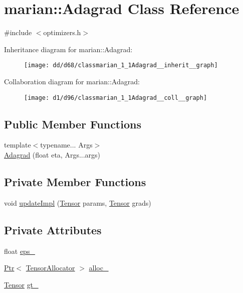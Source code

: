\hypertarget{classmarian_1_1Adagrad}{}\section{marian\+:\+:Adagrad Class Reference}
\label{classmarian_1_1Adagrad}


{\ttfamily \#include $<$optimizers.\+h$>$}



Inheritance diagram for marian\+:\+:Adagrad\+:
\nopagebreak
\begin{figure}[H]
\begin{center}
\leavevmode
\texttt{[image: dd/d68/classmarian\_1\_1Adagrad\_\_inherit\_\_graph]}
\end{center}
\end{figure}


Collaboration diagram for marian\+:\+:Adagrad\+:
\nopagebreak
\begin{figure}[H]
\begin{center}
\leavevmode
\texttt{[image: d1/d96/classmarian\_1\_1Adagrad\_\_coll\_\_graph]}
\end{center}
\end{figure}
\subsection*{Public Member Functions}
\begin{DoxyCompactItemize}
\item 
{\footnotesize template$<$typename... Args$>$ }\\\hyperlink{classmarian_1_1Adagrad_a18d472eea3cd57eb64573b8bab76874c}{Adagrad} (float eta, Args...\+args)
\end{DoxyCompactItemize}
\subsection*{Private Member Functions}
\begin{DoxyCompactItemize}
\item 
void \hyperlink{classmarian_1_1Adagrad_abba8d5d6bb96ff15f4f956f185c7887a}{update\+Impl} (\hyperlink{namespacemarian_a88b71ec34bb354564cddc24eb80f7e14}{Tensor} params, \hyperlink{namespacemarian_a88b71ec34bb354564cddc24eb80f7e14}{Tensor} grads)
\end{DoxyCompactItemize}
\subsection*{Private Attributes}
\begin{DoxyCompactItemize}
\item 
float \hyperlink{classmarian_1_1Adagrad_a1892a60789f7ef407f40222669ca22f7}{eps\+\_\+}
\item 
\hyperlink{namespacemarian_ad1a373be43a00ef9ce35666145137b08}{Ptr}$<$ \hyperlink{classmarian_1_1TensorAllocator}{Tensor\+Allocator} $>$ \hyperlink{classmarian_1_1Adagrad_a753dac5d7bf487e8894d82d4c1564f19}{alloc\+\_\+}
\item 
\hyperlink{namespacemarian_a88b71ec34bb354564cddc24eb80f7e14}{Tensor} \hyperlink{classmarian_1_1Adagrad_a0e809e1fd59eb3033b5a04c7c3122b14}{gt\+\_\+}
\end{DoxyCompactItemize}
